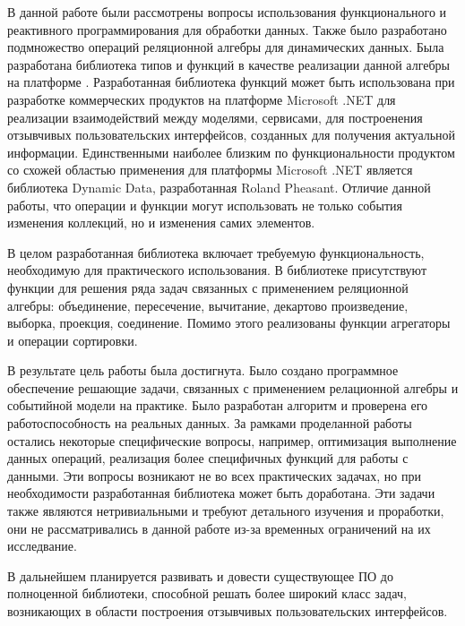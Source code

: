 
В данной работе были рассмотрены вопросы использования функционального и реактивного программирования для обработки данных.
Также было разработано подмножество операций реляционной алгебры для динамических данных.
Была разработана библиотека типов и функций в качестве реализации данной алгебры на платформе \dotnet{}.
Разработанная библиотека функций может быть использована при разработке коммерческих продуктов на платформе Microsoft
.NET для реализации взаимодействий между моделями, сервисами, для построенения отзывчивых пользовательских интерфейсов, созданных для получения актуальной информации.
Единственными наиболее близким по функциональности продуктом со схожей областью
применения для платформы Microsoft .NET является библиотека Dynamic Data,
разработанная Roland Pheasant. Отличие данной работы, что операции и функции могут использовать не только события изменения коллекций, но и изменения самих элементов.

В целом разработанная библиотека включает требуемую функциональность, необходимую для практического использования. В библиотеке присутствуют функции для решения ряда задач связанных с применением
реляционной алгебры: объединение, пересечение, вычитание, декартово произведение, выборка, проекция, соединение.
Помимо этого реализованы функции агрегаторы и операции сортировки.

В результате цель работы была достигнута. Было создано программное обеспечение решающие задачи, связанных с применением релационной алгебры и событийной модели на практике.
Было разработан алгоритм и проверена его работоспособность на реальных данных. За рамками проделанной работы остались некоторые специфические вопросы,
например, оптимизация выполнение данных операций, реализация более специфичных функций для работы с данными.
Эти вопросы возникают не во всех практических задачах, но при необходимости разработанная библиотека может быть доработана.
Эти задачи также являются нетривиальными и требуют детального изучения и проработки,
они не рассматривались в данной работе из-за временных ограничений на их исследвание.

В дальнейшем планируется развивать и довести существующее ПО до полноценной библиотеки, способной решать более широкий класс задач,
возникающих в области построения отзывчивых пользовательских интерфейсов.
